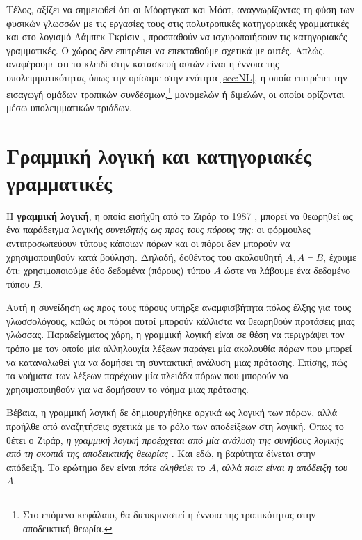\documentclass [a4paper,11pt] {book}
\theoremstyle{definition}
\theoremstyle{definition}
\begin{document}
Τέλος, αξίζει να σημειωθεί ότι οι Μόορτγκατ και Μόοτ, αναγνωρίζοντας τη φύση των φυσικών γλωσσών με τις εργασίες τους στις πολυτροπικές κατηγοριακές γραμματικές \citep{citeulike:5027224}\citep{Moot01proofnets} και στο λογισμό Λάμπεκ-Γκρίσιν \citep{moortgat:2009}\citep{DBLP:journals/corr/abs-1112-6384}, προσπαθούν να ισχυροποιήσουν τις κατηγοριακές γραμματικές. Ο χώρος δεν επιτρέπει να επεκταθούμε σχετικά με αυτές. Απλώς, αναφέρουμε ότι το κλειδί στην κατασκευή αυτών είναι η έννοια της υπολειμματικότητας όπως την ορίσαμε στην ενότητα \ref{sec:NL}, η οποία επιτρέπει την εισαγωγή ομάδων τροπικών συνδέσμων,\footnote{Στο επόμενο κεφάλαιο, θα διευκρινιστεί η έννοια της τροπικότητας στην αποδεικτική θεωρία.} μονομελών ή διμελών, οι οποίοι ορίζονται μέσω υπολειμματικών τριάδων.


\chapter{Γραμμική λογική και κατηγοριακές γραμματικές}

Η \textbf{γραμμική λογική}, η οποία εισήχθη από το Ζιράρ το 1987 \citep{DBLP:journals/tcs/Girard87}, μπορεί να θεωρηθεί ως ένα παράδειγμα λογικής \textit{συνειδητής ως προς τους πόρους της}: οι φόρμουλες αντιπροσωπεύουν τύπους κάποιων πόρων και οι πόροι δεν μπορούν να χρησιμοποιηθούν κατά βούληση. Δηλαδή, δοθέντος του ακολουθητή $A,A \vdash B$, έχουμε ότι: χρησιμοποιούμε δύο δεδομένα (πόρους) τύπου $A$ ώστε να λάβουμε ένα δεδομένο τύπου $B$.

Αυτή η συνείδηση ως προς τους πόρους υπήρξε αναμφισβήτητα πόλος έλξης για τους γλωσσολόγους, καθώς οι πόροι αυτοί μπορούν κάλλιστα να θεωρηθούν προτάσεις μιας γλώσσας. Παραδείγματος χάρη, η γραμμική λογική είναι σε θέση να περιγράψει τον τρόπο με τον οποίο μία αλληλουχία λέξεων παράγει μία ακολουθία πόρων που μπορεί να καταναλωθεί για να δομήσει τη συντακτική ανάλυση μιας πρότασης. Επίσης, πώς τα νοήματα των λέξεων παρέχουν μία πλειάδα πόρων που μπορούν να χρησιμοποιηθούν για να δομήσουν το νόημα μιας πρότασης.

Βέβαια, η γραμμική λογική δε δημιουργήθηκε αρχικά ως λογική των πόρων, αλλά προήλθε από αναζητήσεις σχετικά με το ρόλο των αποδείξεων στη λογική. Όπως το θέτει ο Ζιράρ, \textit{η γραμμική λογική προέρχεται από μία ανάλυση της συνήθους λογικής από τη σκοπιά της αποδεικτικής θεωρίας} \citep{Girard95logic:its}. Και εδώ, η βαρύτητα δίνεται στην απόδειξη. Το ερώτημα δεν είναι \textit{πότε αληθεύει το $A$}, αλλά \textit{ποια είναι η απόδειξη του $A$}.
\end{document}

